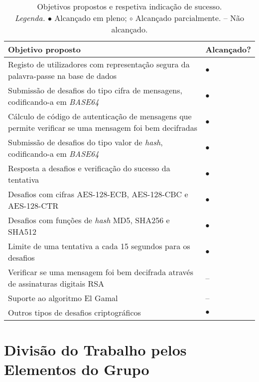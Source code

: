\begin{table}[!htbp]
    \centering
    \begin{tabular}{p{} >{\centering\let\newline\\\arraybackslash\hspace{0pt}}m{}}
        \toprule
        {\bfseries Objetivo proposto} & {\bfseries Alcançado?} \\
        \midrule
        Registo de utilizadores com representação segura da palavra-passe na base de dados & $\bullet$ \\
        Submissão de desafios do tipo cifra de mensagens, codificando-a em \textit{BASE64} & $\bullet$ \\	
        Cálculo de código de autenticação de mensagens que permite verificar se uma mensagem foi bem decifradas & $\bullet$ \\
        Submissão de desafios do tipo valor de \textit{hash}, codificando-a em \textit{BASE64} & $\bullet$ \\
        Resposta a desafios e verificação do sucesso da tentativa  & $\bullet$ \\
        Desafios com cifras AES-128-ECB, AES-128-CBC e AES-128-CTR & $\bullet$ \\
        Desafios com funções de \textit{hash} MD5, SHA256 e SHA512          & $\bullet$ \\
        Limite de uma tentativa a cada 15 segundos para os desafios &  $\bullet$\\
        Verificar se uma mensagem foi bem decifrada através de assinaturas digitais RSA & -- \\
        Suporte ao algoritmo El Gamal                                           & -- \\
        Outros tipos de desafios criptográficos                                   & $\bullet$ \\
        \bottomrule
    \end{tabular}
    \caption[Objetivos propostos vs. alcançados]{
        Objetivos propostos e respetiva indicação de sucesso.\\
        \textit{Legenda.} $\bullet$ Alcançado em pleno; $\circ$ Alcançado parcialmente. -- Não alcançado.
    }
    \label{tab::objetivos}
\end{table}



\section{Divisão do Trabalho pelos Elementos do Grupo}
\label{chap4:sec:divisao}

